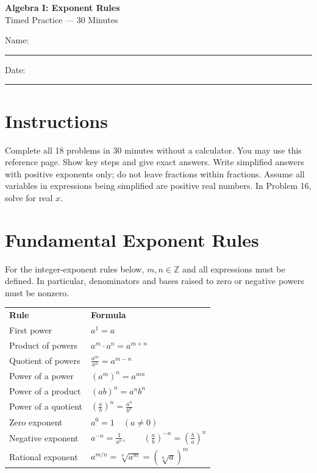 \documentclass[12pt]{article}
\begin{document}
\begin{center}
  {\Large\textbf{Algebra I: Exponent Rules}}\\[3pt]
  {\large Timed Practice --- 30 Minutes}
\end{center}

Name: \rule{2.7in}{0.4pt}\hfill Date: \rule{1.5in}{0.4pt}

\section*{Instructions}
Complete all 18 problems in 30 minutes without a calculator. You may use this
reference page. Show key steps and give exact answers. Write simplified
answers with positive exponents only; do not leave fractions within fractions.
Assume all variables in expressions being simplified are positive real numbers.
In Problem 16, solve for real $x$.

\begingroup
\small
\section*{Fundamental Exponent Rules}
For the integer-exponent rules below, $m,n\in\mathbb Z$ and all expressions
must be defined. In particular, denominators and bases raised to zero or
negative powers must be nonzero.

\medskip
\begingroup
\renewcommand{\arraystretch}{1.7}
\begin{tabular}{@{}p{1.9in}p{4.7in}@{}}
  \textbf{Rule} & \textbf{Formula}\\
  First power & $a^1=a$\\
  Product of powers & $a^m\cdot a^n=a^{m+n}$\\
  Quotient of powers & $\displaystyle\frac{a^m}{a^n}=a^{m-n}$\\
  Power of a power & $(a^m)^n=a^{mn}$\\
  Power of a product & $(ab)^n=a^nb^n$\\
  Power of a quotient & $\displaystyle\left(\frac{a}{b}\right)^n=\frac{a^n}{b^n}$\\
  Zero exponent & $a^0=1\quad(a\ne0)$\\
  Negative exponent & $\displaystyle a^{-n}=\frac{1}{a^n},\qquad
    \left(\frac{a}{b}\right)^{-n}=\left(\frac{b}{a}\right)^n$\\
  Rational exponent & $\displaystyle a^{m/n}=\sqrt[n]{a^m}
    =\left(\sqrt[n]{a}\right)^m$\\
\end{tabular}
\endgroup
\end{document}

